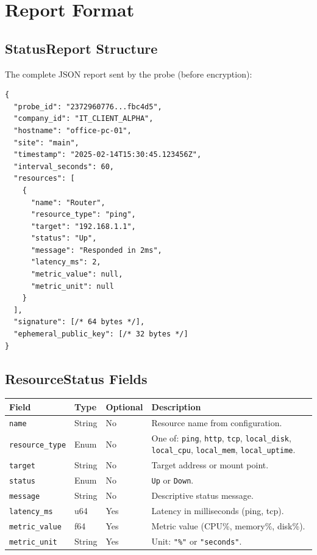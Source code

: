 \documentclass[12pt]{report}
\begin{document}
\section{Report Format}

\subsection{StatusReport Structure}

The complete JSON report sent by the probe (before encryption):

\begin{lstlisting}
{
  "probe_id": "2372960776...fbc4d5",
  "company_id": "IT_CLIENT_ALPHA",
  "hostname": "office-pc-01",
  "site": "main",
  "timestamp": "2025-02-14T15:30:45.123456Z",
  "interval_seconds": 60,
  "resources": [
    {
      "name": "Router",
      "resource_type": "ping",
      "target": "192.168.1.1",
      "status": "Up",
      "message": "Responded in 2ms",
      "latency_ms": 2,
      "metric_value": null,
      "metric_unit": null
    }
  ],
  "signature": [/* 64 bytes */],
  "ephemeral_public_key": [/* 32 bytes */]
}
\end{lstlisting}

\subsection{ResourceStatus Fields}

\begin{longtable}{@{} l l l p{5cm} @{}}
\toprule
\textbf{Field} & \textbf{Type} & \textbf{Optional} & \textbf{Description} \\
\midrule
\texttt{name} & String & No & Resource name from configuration. \\
\texttt{resource\_type} & Enum & No & One of: \texttt{ping}, \texttt{http},
    \texttt{tcp}, \texttt{local\_disk}, \texttt{local\_cpu},
    \texttt{local\_mem}, \texttt{local\_uptime}. \\
\texttt{target} & String & No & Target address or mount point. \\
\texttt{status} & Enum & No & \texttt{Up} or \texttt{Down}. \\
\texttt{message} & String & No & Descriptive status message. \\
\texttt{latency\_ms} & u64 & Yes & Latency in milliseconds (ping, tcp). \\
\texttt{metric\_value} & f64 & Yes & Metric value (CPU\%, memory\%, disk\%).
    \\
\texttt{metric\_unit} & String & Yes & Unit: \texttt{"\%"} or
    \texttt{"seconds"}. \\
\bottomrule
\end{longtable}
\end{document}
